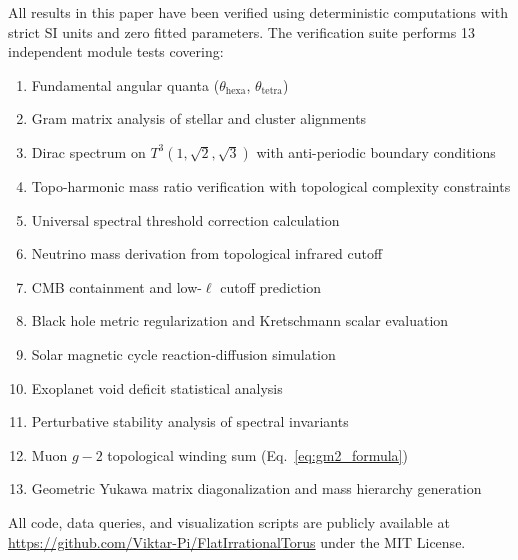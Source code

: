 \documentclass[onecolumn,aps,prd,superscriptaddress,nofootinbib,amsmath,amssymb]{revtex4-2}
\theoremstyle{definition}
\theoremstyle{remark}
\newcommand{\Tthree}{T^3(1,\sqrt{2},\sqrt{3})}
\begin{document}
All results in this paper have been verified using deterministic computations with strict SI units and zero fitted parameters.
The verification suite performs 13 independent module tests covering:
\begin{enumerate}
\item Fundamental angular quanta ($\theta_{\text{hexa}}$, $\theta_{\text{tetra}}$)
\item Gram matrix analysis of stellar and cluster alignments
\item Dirac spectrum on $\Tthree$ with anti-periodic boundary conditions
\item Topo-harmonic mass ratio verification with topological complexity constraints
\item Universal spectral threshold correction calculation
\item Neutrino mass derivation from topological infrared cutoff
\item CMB containment and low-$\ell$ cutoff prediction
\item Black hole metric regularization and Kretschmann scalar evaluation
\item Solar magnetic cycle reaction-diffusion simulation
\item Exoplanet void deficit statistical analysis
\item Perturbative stability analysis of spectral invariants
\item Muon $g-2$ topological winding sum (Eq.~\ref{eq:gm2_formula})
\item Geometric Yukawa matrix diagonalization and mass hierarchy generation
\end{enumerate}

All code, data queries, and visualization scripts are publicly available at \url{https://github.com/Viktar-Pi/FlatIrrationalTorus} under the MIT License.
\end{document}
